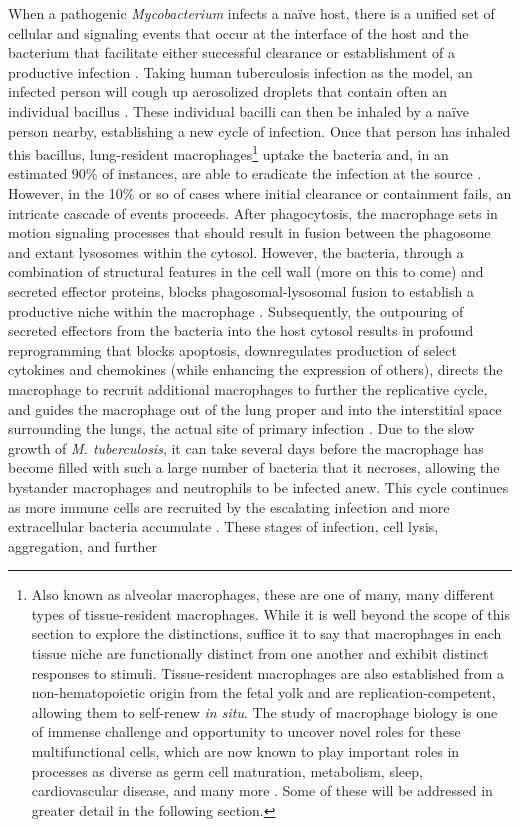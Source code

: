 When a pathogenic \textit{Mycobacterium} infects a na\"{i}ve host, there is a unified set of cellular and signaling events that occur at the interface of the host and the bacterium that facilitate either successful clearance or establishment of a productive infection \citep{Davies2001b, Bohrer2021, Gagneux2006a, Turner2017}. Taking human tuberculosis infection as the model, an infected person will cough up aerosolized droplets that contain often an individual bacillus \citep{Churchyard2017, Mathema2017}. These individual bacilli can then be inhaled by a na\"{i}ve person nearby, establishing a new cycle of infection. Once that person has inhaled this bacillus, lung-resident macrophages\footnote{Also known as alveolar macrophages, these are one of many, many different types of tissue-resident macrophages. While it is well beyond the scope of this section to explore the distinctions, suffice it to say that macrophages in each tissue niche are functionally distinct from one another and exhibit distinct responses to stimuli. Tissue-resident macrophages are also established from a non-hematopoietic origin from the fetal yolk and are replication-competent, allowing them to self-renew \textit{in situ}. The study of macrophage biology is one of immense challenge and opportunity to uncover novel roles for these multifunctional cells, which are now known to play important roles in processes as diverse as germ cell maturation, metabolism, sleep, cardiovascular disease, and many more \citep{Davies2013, Hussell2014}. Some of these will be addressed in greater detail in the following section.} uptake the bacteria and, in an estimated 90\% of instances, are able to eradicate the infection at the source \citep{Verrall2014, OGarra2013}. However, in the 10\% or so of cases where initial clearance or containment fails, an intricate cascade of events proceeds. After phagocytosis, the macrophage sets in motion signaling processes that should result in fusion between the phagosome and extant lysosomes within the cytosol. However, the bacteria, through a combination of structural features in the cell wall (more on this to come) and secreted effector proteins, blocks phagosomal-lysosomal fusion to establish a productive niche within the macrophage \citep{McDonough1993, Pieters2008}. Subsequently, the outpouring of secreted effectors from the bacteria into the host cytosol results in profound reprogramming that blocks apoptosis, downregulates production of select cytokines and chemokines (while enhancing the expression of others), directs the macrophage to recruit additional macrophages to further the replicative cycle, and guides the macrophage out of the lung proper and into the interstitial space surrounding the lungs, the actual site of primary infection \citep{Peters2003, Upadhyay2018, Ramakrishnan2012, Cohen2018}. Due to the slow growth of \textit{M. tuberculosis}, it can take several days before the macrophage has become filled with such a large number of bacteria that it necroses, allowing the bystander macrophages and neutrophils to be infected anew. This cycle continues as more immune cells are recruited by the escalating infection and more extracellular bacteria accumulate \citep{Cadena2016, Lin2006a, Corleis2020, Orme2014a}. These stages of infection, cell lysis, aggregation, and further 